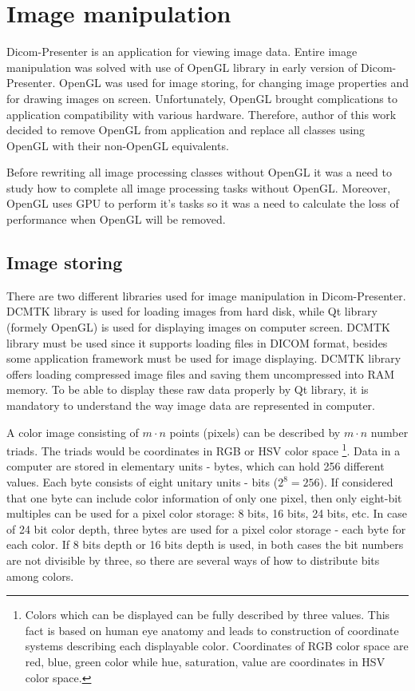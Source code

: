 \chapter{Image manipulation}
\vspace{-10mm}

Dicom-Presenter is an application for viewing image data. Entire image manipulation was solved with use of OpenGL library in early version of Dicom-Presenter. OpenGL was used for image storing, for changing image properties and for drawing images on screen. Unfortunately, OpenGL brought complications to application compatibility with various hardware. Therefore, author of this work decided to remove OpenGL from application and replace all classes using OpenGL with their non-OpenGL equivalents. 

Before rewriting all image processing classes without OpenGL it was a need to study how to complete all image processing tasks without OpenGL. Moreover, OpenGL uses GPU to perform it's tasks so it was a need to calculate the loss of performance when OpenGL will be removed. 

\section{Image storing}
\label{rawdata}
There are two different libraries used for image manipulation in Dicom-Presenter. DCMTK library is used for loading images from hard disk, while Qt library (formely OpenGL) is used for displaying images on computer screen. DCMTK library must be used since it supports loading files in DICOM format, besides some application framework must be used for image displaying. DCMTK library offers loading compressed image files and saving them uncompressed into RAM memory. To be able to display these raw data properly by Qt library, it is mandatory to understand the way image data are represented in computer. 

A color image consisting of $m \cdot n$ points (pixels) can be described by $m \cdot n$ number triads. The triads would be coordinates in RGB or HSV color space \footnote{Colors which can be displayed can be fully described by three values. This fact is based on human eye anatomy and leads to construction of coordinate systems describing each displayable color. Coordinates of RGB color space are red, blue, green color while hue, saturation, value are coordinates in HSV color space.}. Data in a computer are stored in elementary units - bytes, which can hold 256 different values. Each byte consists of eight unitary units - bits ($2^8 = 256 $). If considered that one byte can include color information of only one pixel, then only eight-bit multiples can be used for a pixel color storage: 8 bits, 16 bits, 24 bits, etc. In case of 24 bit color depth, three bytes are used for a pixel color storage - each byte for each color. If 8 bits depth or 16 bits depth is used, in both cases the bit numbers are not divisible by three, so there are several ways of how to distribute bits among colors.
 
